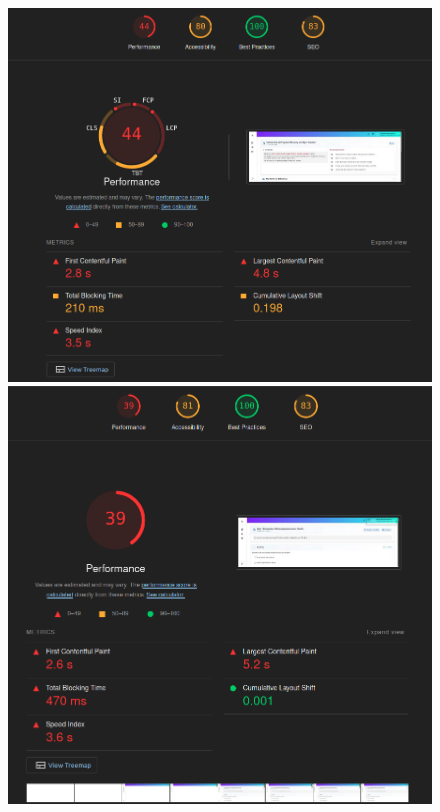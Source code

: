 \begin{figure}[H]
\begin{minipage}{0.45\textwidth}
  \centering
  \includegraphics[width=\linewidth]{images/lighthouse_module_page_eval.png}
\end{minipage}
\hfill
\begin{minipage}{0.45\textwidth}
  \centering
  \includegraphics[width=\linewidth]{images/lighthouse_quiz_page_eval.png}
\end{minipage}


\end{figure}
